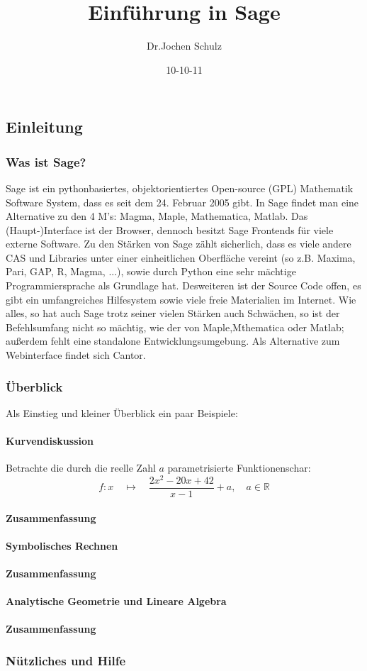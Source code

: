 \documentclass[fontsize=12pt,paper=a4,twoside,bibtotoc,idxtotoc,
liststotoc,pagesize,BCOR1.2cm,DIV15,chapterprefix,pagesize=pdftex]{scrbook}
\title{Einführung in Sage}
\author{Dr.Jochen Schulz}
\date{10-10-11}
\begin{document}
\maketitle
\tableofcontents
\chapter{}
\section{Einleitung}
\subsection{Was ist Sage?}
Sage ist ein pythonbasiertes, objektorientiertes Open-source (GPL) Mathematik Software System, dass es seit dem 24. Februar 2005 gibt.
In Sage findet man eine Alternative zu den 4 M's: Magma, Maple, Mathematica, Matlab.\newline
Das (Haupt-)Interface ist der Browser, dennoch besitzt Sage Frontends für viele externe Software.\newline
Zu den Stärken von Sage zählt sicherlich, dass es viele andere CAS und Libraries unter einer einheitlichen Oberfl\"ache vereint 
(so z.B. Maxima, Pari, GAP, R, Magma, ...), sowie durch Python eine sehr mächtige Programmiersprache als Grundlage hat. Desweiteren 
ist der Source Code offen, es gibt ein umfangreiches Hilfesystem sowie viele freie Materialien im Internet.\newline
Wie alles, so hat auch Sage trotz seiner vielen Stärken auch Schwächen, so ist der Befehlsumfang nicht so mächtig, wie der von Maple,Mthematica 
oder Matlab; außerdem fehlt eine standalone Entwicklungsumgebung. Als Alternative zum Webinterface findet sich Cantor.
\newpage
\subsection{Überblick}
Als Einstieg und kleiner Überblick ein paar Beispiele:
\subsubsection{Kurvendiskussion}
Betrachte die durch die reelle Zahl $a$ parametrisierte Funktionenschar:
\[ 
f: x \quad \mapsto \quad \frac{2x^2-20x+42}{x-1}+a, \quad
a \in \mathbb{R} 
\]
\subsubsection{Zusammenfassung}
\subsubsection{Symbolisches Rechnen}
\subsubsection{Zusammenfassung}
\subsubsection{Analytische Geometrie und Lineare Algebra}
\subsubsection{Zusammenfassung}
\newpage
\subsection{Nützliches und Hilfe}
\end{document}
